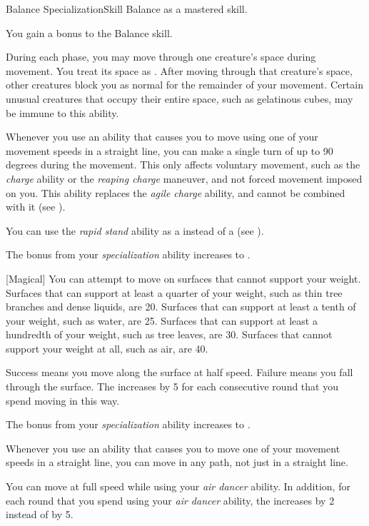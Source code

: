     \begin{feat}{Balance Specialization}{Skill}
        \featpre Balance as a mastered skill.

         You gain a  bonus to the Balance skill.

         During each phase, you may move through one creature's space during movement.
        You treat its space as .
        After moving through that creature's space, other creatures block you as normal for the remainder of your movement.
        Certain unusual creatures that occupy their entire space, such as gelatinous cubes, may be immune to this ability.

         Whenever you use an ability that causes you to move using one of your movement speeds in a straight line, you can make a single turn of up to 90 degrees during the movement. 
        This only affects voluntary movement, such as the \textit{charge} ability or the \textit{reaping charge} maneuver, and not forced movement imposed on you.
        This ability replaces the \textit{agile charge} ability, and cannot be combined with it (see ).

         You can use the \textit{rapid stand} ability as a  instead of a  (see ).

         The bonus from your \textit{specialization} ability increases to .

        [Magical] You can attempt to move on surfaces that cannot support your weight.
        Surfaces that can support at least a quarter of your weight, such as thin tree branches and dense liquids, are  20.
        Surfaces that can support at least a tenth of your weight, such as water, are  25.
        Surfaces that can support at least a hundredth of your weight, such as tree leaves, are  30.
        Surfaces that cannot support your weight at all, such as air, are  40.

        Success means you move along the surface at half speed.
        Failure means you fall through the surface.
        The  increases by 5 for each consecutive round that you spend moving in this way.

         The bonus from your \textit{specialization} ability increases to .

         Whenever you use an ability that causes you to move one of your movement speeds in a straight line, you can move in any path, not just in a straight line.

         You can move at full speed while using your \textit{air dancer} ability.
        In addition, for each round that you spend using your \textit{air dancer} ability, the  increases by 2 instead of by 5.
    \end{feat}

